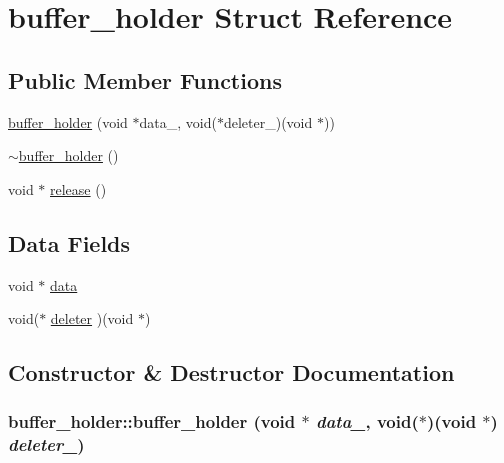 \hypertarget{structbuffer__holder}{
\section{buffer\_\-holder Struct Reference}
\label{structbuffer__holder}
}
\subsection*{Public Member Functions}
\begin{CompactItemize}
\item 
\hyperlink{structbuffer__holder_ec91ad4dabc8db2a6cacac601b317857}{buffer\_\-holder} (void $\ast$data\_\-, void($\ast$deleter\_\-)(void $\ast$))
\item 
\hyperlink{structbuffer__holder_43e10af0ca501bfa9bd1c2a012937876}{$\sim$buffer\_\-holder} ()
\item 
void $\ast$ \hyperlink{structbuffer__holder_dd9b75027bdf15dee0e2dc88225d5b10}{release} ()
\end{CompactItemize}
\subsection*{Data Fields}
\begin{CompactItemize}
\item 
void $\ast$ \hyperlink{structbuffer__holder_06c1e1004fac90848dfdb4fbc150cede}{data}
\item 
void($\ast$ \hyperlink{structbuffer__holder_96e7067c68bc1f7a9ee7dd75c84f04e8}{deleter} )(void $\ast$)
\end{CompactItemize}


\subsection{Constructor \& Destructor Documentation}
\hypertarget{structbuffer__holder_ec91ad4dabc8db2a6cacac601b317857}{
\subsubsection[buffer\_\-holder]{\setlength{\rightskip}{0pt plus 5cm}buffer\_\-holder::buffer\_\-holder (void $\ast$ {\em data\_\-}, void($\ast$)(void $\ast$) {\em deleter\_\-})}}
\label{structbuffer__holder_ec91ad4dabc8db2a6cacac601b317857}


